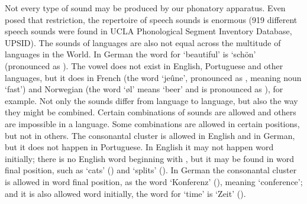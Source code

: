 Not every type of sound may be produced by our phonatory apparatus. Even posed that restriction, the repertoire of speech sounds is enormous (919 different speech sounds were found in UCLA Phonological Segment Inventory Database, UPSID). The sounds of languages are also not equal across the multitude of languages in the World. In German the word for `beautiful' is `schön' (pronounced as \textipa{[S\o:n]}). The vowel \textipa{[\o]} does not exist in English, Portuguese and other languages, but it does in French (the word `jeûne', pronounced as \textipa{[Z\o n]}, meaning noun `fast') and Norwegian (the word `\o l' means `beer' and is pronounced as \textipa{[\o l]}), for example. Not only the sounds differ from language to language, but also the way they might be combined. Certain combinations of sounds are allowed and others are impossible in a language. Some combinations are allowed in certain positions, but not in others. The consonantal cluster \textipa{[ts]} is allowed in English and in German, but it does not happen in Portuguese. In English it may not happen word initially; there is no English word beginning with \textipa{[ts]}, but it may be found in word final position, such as `cats' (\textipa{[k\ae ts]}) and `splits' (\textipa{[splits]}). In German the consonantal cluster is allowed in word final position, as the word `Konferenz' (), meaning `conference'; and it is also allowed word initially, the word for `time' is `Zeit' (\textipa{[tsaIt]}).

